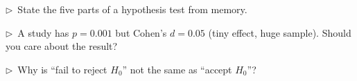 \begin{reflect}
$\triangleright$~State the five parts of a hypothesis test from memory.

\smallskip
$\triangleright$~A study has $p = 0.001$ but Cohen's $d = 0.05$ (tiny effect, huge sample). Should you care about the result?

\smallskip
$\triangleright$~Why is ``fail to reject $H_0$'' not the same as ``accept $H_0$''?
\end{reflect}
